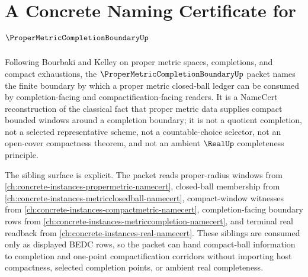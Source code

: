 \chapter{A Concrete Naming Certificate for $\ProperMetricCompletionBoundaryUp$}
\label{ch:concrete-instances-proper-metric-completion-boundary-namecert}

Following Bourbaki and Kelley on proper metric spaces, completions, and compact exhaustions, the $\ProperMetricCompletionBoundaryUp$ packet names the finite boundary by which a proper metric closed-ball ledger can be consumed by completion-facing and compactification-facing readers. It is a NameCert reconstruction of the classical fact that proper metric data supplies compact bounded windows around a completion boundary; it is not a quotient completion, not a selected representative scheme, not a countable-choice selector, not an open-cover compactness theorem, and not an ambient $\RealUp$ completeness principle.

The sibling surface is explicit. The packet reads proper-radius windows from \autoref{ch:concrete-instances-propermetric-namecert}, closed-ball membership from \autoref{ch:concrete-instances-metricclosedball-namecert}, compact-window witnesses from \autoref{ch:concrete-instances-compactmetric-namecert}, completion-facing boundary rows from \autoref{ch:concrete-instances-metriccompletion-namecert}, and terminal real readback from \autoref{ch:concrete-instances-real-namecert}. These siblings are consumed only as displayed BEDC rows, so the packet can hand compact-ball information to completion and one-point compactification corridors without importing host compactness, selected completion points, or ambient real completeness.

